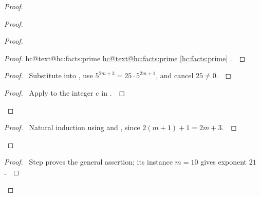 \documentclass[11pt]{amsart}
\makeatletter
\let\qed\relax
\let\hcSavedRef\ref
\renewcommand{\ref}[1]{%
  \ifcsname hc@text@#1\endcsname
    \hyperlink{\csname hc@target@#1\endcsname}{\csname hc@text@#1\endcsname}%
  \else
    \hcSavedRef{#1}%
  \fi}}
\makeatother
\begin{document}
\begin{proof}
\begin{proof}
\begin{proof}
\begin{proof}
    \ref{hc:facts:prime}.~\qed\end{proof}
   \begin{proof}\pf\ Substitute  into
    , use $5^{2m+3}=25\cdot5^{2m+1}$, and cancel $25\ne0$.~\qed\end{proof}
   \qedstep
   \begin{proof}\pf\ Apply  to the integer $e$ in
    .~\qed\end{proof}
  \end{proof}
  \qedstep
  \begin{proof}\pf\ Natural induction using  and
   , since $2(m+1)+1=2m+3$.~\qed\end{proof}
 \end{proof}
 \qedstep
 \begin{proof}\pf\ Step  proves the general assertion;
  its instance $m=10$ gives exponent $21$.~\qed\end{proof}
\end{proof}
\end{document}
